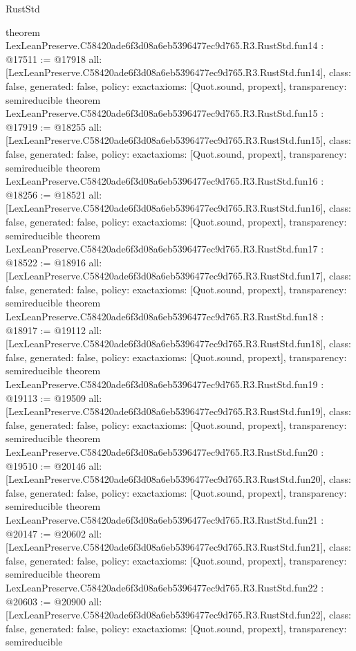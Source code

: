 \begin{lexlean}{RustStd}
\begin{coremodule}
{}
theorem LexLeanPreserve.C58420ade6f3d08a6eb5396477ec9d765.R3.RustStd.fun14 : @17511 := @17918 {
  all: [LexLeanPreserve.C58420ade6f3d08a6eb5396477ec9d765.R3.RustStd.fun14],
  class: false,
  generated: false,
  policy: exact{axioms: [Quot.sound, propext]},
  transparency: semireducible
}
theorem LexLeanPreserve.C58420ade6f3d08a6eb5396477ec9d765.R3.RustStd.fun15 : @17919 := @18255 {
  all: [LexLeanPreserve.C58420ade6f3d08a6eb5396477ec9d765.R3.RustStd.fun15],
  class: false,
  generated: false,
  policy: exact{axioms: [Quot.sound, propext]},
  transparency: semireducible
}
theorem LexLeanPreserve.C58420ade6f3d08a6eb5396477ec9d765.R3.RustStd.fun16 : @18256 := @18521 {
  all: [LexLeanPreserve.C58420ade6f3d08a6eb5396477ec9d765.R3.RustStd.fun16],
  class: false,
  generated: false,
  policy: exact{axioms: [Quot.sound, propext]},
  transparency: semireducible
}
theorem LexLeanPreserve.C58420ade6f3d08a6eb5396477ec9d765.R3.RustStd.fun17 : @18522 := @18916 {
  all: [LexLeanPreserve.C58420ade6f3d08a6eb5396477ec9d765.R3.RustStd.fun17],
  class: false,
  generated: false,
  policy: exact{axioms: [Quot.sound, propext]},
  transparency: semireducible
}
theorem LexLeanPreserve.C58420ade6f3d08a6eb5396477ec9d765.R3.RustStd.fun18 : @18917 := @19112 {
  all: [LexLeanPreserve.C58420ade6f3d08a6eb5396477ec9d765.R3.RustStd.fun18],
  class: false,
  generated: false,
  policy: exact{axioms: [Quot.sound, propext]},
  transparency: semireducible
}
theorem LexLeanPreserve.C58420ade6f3d08a6eb5396477ec9d765.R3.RustStd.fun19 : @19113 := @19509 {
  all: [LexLeanPreserve.C58420ade6f3d08a6eb5396477ec9d765.R3.RustStd.fun19],
  class: false,
  generated: false,
  policy: exact{axioms: [Quot.sound, propext]},
  transparency: semireducible
}
theorem LexLeanPreserve.C58420ade6f3d08a6eb5396477ec9d765.R3.RustStd.fun20 : @19510 := @20146 {
  all: [LexLeanPreserve.C58420ade6f3d08a6eb5396477ec9d765.R3.RustStd.fun20],
  class: false,
  generated: false,
  policy: exact{axioms: [Quot.sound, propext]},
  transparency: semireducible
}
theorem LexLeanPreserve.C58420ade6f3d08a6eb5396477ec9d765.R3.RustStd.fun21 : @20147 := @20602 {
  all: [LexLeanPreserve.C58420ade6f3d08a6eb5396477ec9d765.R3.RustStd.fun21],
  class: false,
  generated: false,
  policy: exact{axioms: [Quot.sound, propext]},
  transparency: semireducible
}
theorem LexLeanPreserve.C58420ade6f3d08a6eb5396477ec9d765.R3.RustStd.fun22 : @20603 := @20900 {
  all: [LexLeanPreserve.C58420ade6f3d08a6eb5396477ec9d765.R3.RustStd.fun22],
  class: false,
  generated: false,
  policy: exact{axioms: [Quot.sound, propext]},
  transparency: semireducible
}
\end{coremodule}
\end{lexlean}
